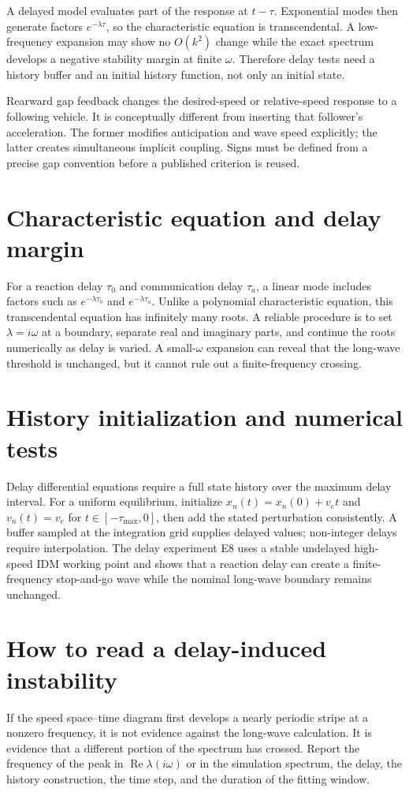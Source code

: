 \documentclass[11pt,a4paper,openany]{book}
\numberwithin{equation}{chapter}
\numberwithin{figure}{chapter}
\numberwithin{table}{chapter}
\newcommand{\Rea}{\operatorname{Re}}
\begin{document}
A delayed model evaluates part of the response at $t-\tau$. Exponential modes then generate factors $e^{-\lambda\tau}$, so the characteristic equation is transcendental. A low-frequency expansion may show no $O(k^2)$ change while the exact spectrum develops a negative stability margin at finite $\omega$. Therefore delay tests need a history buffer and an initial history function, not only an initial state.

Rearward gap feedback changes the desired-speed or relative-speed response to a following vehicle. It is conceptually different from inserting that follower's acceleration. The former modifies anticipation and wave speed explicitly; the latter creates simultaneous implicit coupling. Signs must be defined from a precise gap convention before a published criterion is reused.

\section{Characteristic equation and delay margin}
For a reaction delay $\tau_0$ and communication delay $\tau_a$, a linear mode includes factors such as $e^{-\lambda\tau_0}$ and $e^{-\lambda\tau_a}$. Unlike a polynomial characteristic equation, this transcendental equation has infinitely many roots. A reliable procedure is to set $\lambda=i\omega$ at a boundary, separate real and imaginary parts, and continue the roots numerically as delay is varied. A small-$\omega$ expansion can reveal that the long-wave threshold is unchanged, but it cannot rule out a finite-frequency crossing.

\section{History initialization and numerical tests}
Delay differential equations require a full state history over the maximum delay interval. For a uniform equilibrium, initialize $x_n(t)=x_n(0)+v_et$ and $v_n(t)=v_e$ for $t\in[-\tau_{\max},0]$, then add the stated perturbation consistently. A buffer sampled at the integration grid supplies delayed values; non-integer delays require interpolation. The delay experiment E8 uses a stable undelayed high-speed IDM working point and shows that a reaction delay can create a finite-frequency stop-and-go wave while the nominal long-wave boundary remains unchanged.

\section{How to read a delay-induced instability}
If the speed space--time diagram first develops a nearly periodic stripe at a nonzero frequency, it is not evidence against the long-wave calculation. It is evidence that a different portion of the spectrum has crossed. Report the frequency of the peak in $\Rea\lambda(i\omega)$ or in the simulation spectrum, the delay, the history construction, the time step, and the duration of the fitting window.
\end{document}
